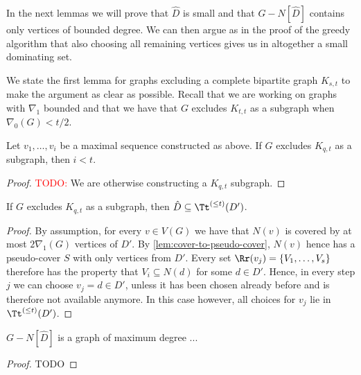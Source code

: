 \begin{center}
\end{center}

In the next lemmas we will prove that $\hat{D}$ is small
and that $G-N[\hat D]$ contains only vertices of bounded degree.
We can then argue as in the proof of the greedy algorithm that
also choosing all remaining vertices gives us in altogether a
small dominating set.

\smallskip
We state the first lemma for graphs excluding a complete
bipartite graph $K_{s,t}$ to make the argument as clear as possible.
Recall that we are working on graphs with $\nabla_1$ bounded
and that we have that $G$ excludes $K_{t,t}$ as a subgraph when
\mbox{$\nabla_0(G)< t/2$}.

\begin{lemma}
Let $v_1,\ldots, v_i$ be a maximal sequence constructed as above.
If $G$ excludes $K_{q,t}$ as a subgraph, then $i<t$.
\end{lemma}
\begin{proof}
\textcolor{red}{TODO: } We are otherwise constructing a $K_{q,t}$ subgraph.
\end{proof}


\begin{lemma}
If $G$ excludes $K_{q,t}$ as a subgraph, then
$\hat D\subseteq \Tt^{(\leq t)}(D')$.
\end{lemma}
\begin{proof}
By assumption, for every $v\in V(G)$ we have that $N(v)$ is
covered by at most $2\nabla_1(G)$ vertices of $D'$. By
\cref{lem:cover-to-pseudo-cover}, $N(v)$ hence has
a pseudo-cover $S$ with only vertices from $D'$. Every set
$\Rr(v_j)=\{V_1,\ldots, V_s\}$ therefore has the property that
$V_i\subseteq N(d)$ for some $d\in D'$. Hence, in every
step $j$ we can choose $v_j=d\in D'$, unless it has been chosen
already before and is therefore not available anymore. In this
case however, all choices for $v_j$ lie in $\Tt^{(\leq t)}(D')$.
\end{proof}


\begin{lemma}
$G-N[\hat D]$ is a graph of maximum degree ...
\end{lemma}
\begin{proof}
TODO
\end{proof}
